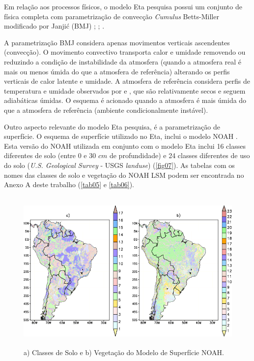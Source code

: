 Em relação aos processos físicos, o modelo Eta pesquisa possui um conjunto de física completa com parametrização de convecção \textit{Cumulus} Betts-Miller modificado por Janjić (BMJ) \cite{betts86}; \cite{bettsmiller86}; \cite{janjic94}.

A parametrização BMJ considera apenas movimentos verticais ascendentes (convecção). O movimento convectivo transporta calor e umidade removendo ou reduzindo a condição de instabilidade da atmosfera (quando a atmosfera real é mais ou menos úmida do que a atmosfera de referência) alterando os perfis verticais de calor latente e umidade. A atmosfera de referência considera perfis de temperatura e umidade observados por  e , que são relativamente secos e seguem adiabáticas úmidas. O esquema é acionado quando a atmosfera é mais úmida do que a atmosfera de referência (ambiente condicionalmente instável).

Outro aspecto relevante do modelo Eta pesquisa, é a parametrização de superfície. O esquema de superfície utilizado no Eta, inclui o modelo NOAH \cite{mitchelletal01}. Esta versão do NOAH utilizada em conjunto com o modelo Eta  inclui 16 classes diferentes de solo (entre 0 e 30 $cm$ de profundidade) e 24 classes diferentes de uso do solo (\textit{U.S. Geological Survey} - USGS \textit{landuse}) (\autoref{fig07}). As tabelas com os nomes das classes de solo e vegetação do NOAH LSM podem ser encontrada no Anexo A deste trabalho (\autoref{tab05} e \autoref{tab06}).

\begin{figure}[!hb]
\centering
\includegraphics[height=8cm]{./figs/solo_veg_new.png}
\caption{a) Classes de Solo e b) Vegetação do Modelo de Superfície NOAH.}
\label{fig07}
\end{figure}


